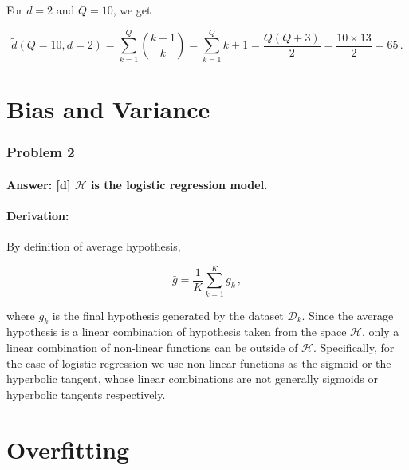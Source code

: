 \documentclass[11pt]{article}
\begin{document}
For \(d=2\) and \(Q=10\), we get

\begin{equation}
\tilde{d}(Q=10,d=2)=\sum^Q_{k=1}{k+1 \choose k}= \sum^Q_{k=1} k+1 = \frac{Q(Q+3)}{2} = \frac{10 \times 13}{2}=65\,.
\end{equation}

    \hypertarget{bias-and-variance}{%
\part{Bias and Variance}\label{bias-and-variance}}

\hypertarget{problem-2}{%
\section{Problem 2}\label{problem-2}}

\hypertarget{answer-d-mathcalh-is-the-logistic-regression-model.}{%
\subsection{\texorpdfstring{Answer: {[}d{]} \(\mathcal{H}\) is the
logistic regression
model.}{Answer: {[}d{]} \textbackslash{}mathcal\{H\} is the logistic regression model.}}\label{answer-d-mathcalh-is-the-logistic-regression-model.}}

\hypertarget{derivation}{%
\subsection{Derivation:}\label{derivation}}

By definition of average hypothesis,

\begin{equation}
\bar{g}=\frac{1}{K}\sum_{k=1}^K g_k\,,
\end{equation}

where \(g_k\) is the final hypothesis generated by the dataset
\(\mathcal{D}_k\). Since the average hypothesis is a linear combination
of hypothesis taken from the space \(\mathcal{H}\), only a linear
combination of non-linear functions can be outside of \(\mathcal{H}\).
Specifically, for the case of logistic regression we use non-linear
functions as the sigmoid or the hyperbolic tangent, whose linear
combinations are not generally sigmoids or hyperbolic tangents
respectively.

    \hypertarget{overfitting}{%
\part{Overfitting}\label{overfitting}}
\end{document}
